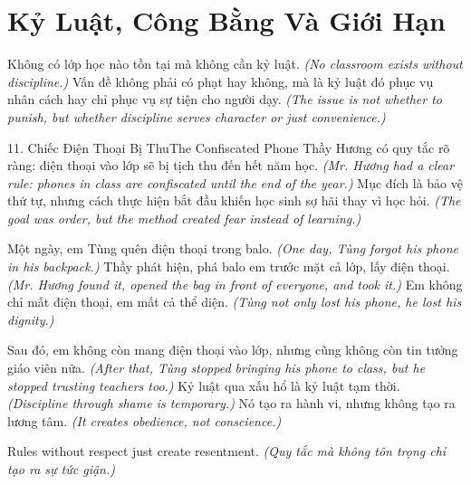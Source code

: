 \chapter{Kỷ Luật, Công Bằng Và Giới Hạn}

\begin{leadbox}
Không có lớp học nào tồn tại mà không cần kỷ luật.
\textit{(No classroom exists without discipline.)}
Vấn đề không phải có phạt hay không, mà là kỷ luật đó phục vụ nhân cách hay chỉ phục vụ sự tiện cho người dạy.
\textit{(The issue is not whether to punish, but whether discipline serves character or just convenience.)}
\end{leadbox}

\begin{truyen}{11. Chiếc Điện Thoại Bị Thu}{The Confiscated Phone}
Thầy Hương có quy tắc rõ ràng: điện thoại vào lớp sẽ bị tịch thu đến hết năm học.
\textit{(Mr. Hương had a clear rule: phones in class are confiscated until the end of the year.)}
Mục đích là bảo vệ thứ tự, nhưng cách thực hiện bắt đầu khiến học sinh sợ hãi thay vì học hỏi.
\textit{(The goal was order, but the method created fear instead of learning.)}

Một ngày, em Tùng quên điện thoại trong balo.
\textit{(One day, Tùng forgot his phone in his backpack.)}
Thầy phát hiện, phá balo em trước mặt cả lớp, lấy điện thoại.
\textit{(Mr. Hương found it, opened the bag in front of everyone, and took it.)}
Em không chỉ mất điện thoại, em mất cả thể diện.
\textit{(Tùng not only lost his phone, he lost his dignity.)}

Sau đó, em không còn mang điện thoại vào lớp, nhưng cũng không còn tin tưởng giáo viên nữa.
\textit{(After that, Tùng stopped bringing his phone to class, but he stopped trusting teachers too.)}
Kỷ luật qua xấu hổ là kỷ luật tạm thời.
\textit{(Discipline through shame is temporary.)}
Nó tạo ra hành vi, nhưng không tạo ra lương tâm.
\textit{(It creates obedience, not conscience.)}
\end{truyen}

\begin{ghinhoanh}
Rules without respect just create resentment.
\textit{(Quy tắc mà không tôn trọng chỉ tạo ra sự tức giận.)}
\end{ghinhoanh}

